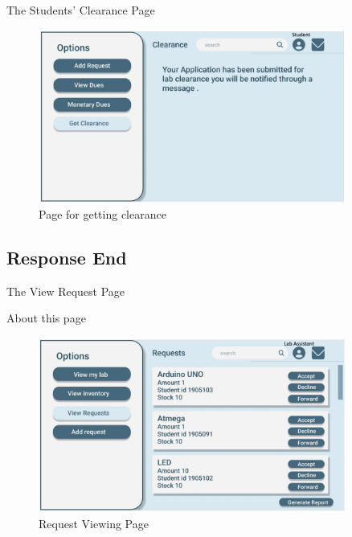 \documentclass[20pt]{beamer}
\numberwithin{figure}{section}
\begin{document}
\begin{frame}{The Students' Clearance Page}

     \begin{figure}
        \centering
        \includegraphics[width= 0.9\textwidth , height= 0.5\paperheight]{SudentClearanceUI.png}
        \caption{Page for getting clearance}
        \label{fig:58}
    \end{figure}

\end{frame}

\subsection{Response End}

\begin{frame}{The View Request Page}

    \begin{block}{About this page}

    \vspace{10}


    \vspace{10}

    \end{block}

     \begin{figure}
        \centering
        \includegraphics[width= 0.9\textwidth , height= 0.5\paperheight]{ViewRequestUI.png}
        \caption{Request Viewing Page}
        \label{fig:59}
    \end{figure}

\end{frame}
\end{document}
